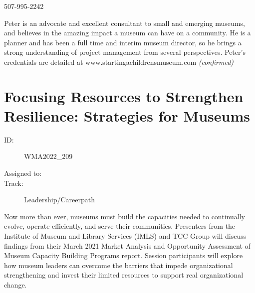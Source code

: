 \documentclass{report}
\begin{document}
                507-995-2242\newline

                Peter is an advocate and excellent consultant to small and emerging museums, and believes in the amazing impact a museum can have on a community. He is a planner and has been a full time and interim museum director, so he brings a strong understanding of project management from several perspectives.  Peter’s credentials are detailed at www.startingachildrensmuseum.com
                \emph{ (confirmed) }
              

              

              
        
          \newpage
          \section{ Focusing Resources to Strengthen Resilience: Strategies for Museums }
            \begin{description}
              \item [ID:]
              WMA2022\_209

              \item [Assigned to:]
                \item [Track:]Leadership/Careerpath~
              \end{description}

              Now more than ever, museums must build the capacities needed to continually evolve, operate efficiently, and serve their communities. Presenters from the Institute of Museum and Library Services (IMLS) and TCC Group will discuss findings from their March 2021 Market Analysis and Opportunity Assessment of Museum Capacity Building Programs report. Session participants will explore how museum leaders can overcome the barriers that impede organizational strengthening and invest their limited resources to support real organizational change.
\end{document}
